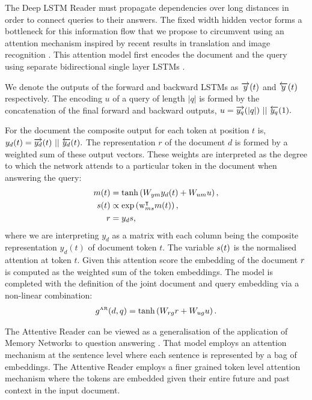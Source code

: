 \documentclass{article}
\newcommand{\wtmat}[2]{W_{#1 #2}}
\begin{document}
The Deep LSTM Reader must propagate dependencies over long distances in order to
connect queries to their answers. The fixed width hidden vector forms a
bottleneck for this information flow that we propose to circumvent using an
attention mechanism inspired by recent results in translation and image
recognition \cite{Bahdanau:2014:NMT,Mnih:2014:RMVA}.
This attention model first encodes the document and the query using separate
bidirectional single layer LSTMs \cite{Graves:2012:SSLRNN}.

We denote the
outputs of the forward and backward LSTMs as $\overrightarrow{y}(t)$ and $\overleftarrow{y}(t)$
respectively.  The encoding $u$ of a query of length $|q|$ is formed by the
concatenation of the final forward and backward outputs,
$u = \overrightarrow{y_q}(|q|)\,\, ||\,\, \overleftarrow{y_q}(1).$

For the document the composite output for each token at position $t$ is,
$y_d(t) = \overrightarrow{y_d}(t)\,\, ||\,\, \overleftarrow{y_d}(t).$
The representation $r$ of the document $d$ is formed by a weighted sum of these
output vectors. These weights are interpreted as the degree to which the network
attends to a particular token in the document when answering the query:
\begin{align*}
  \attnIn(t)    &= \tanh\left(\wtmat{\attnOver}{\attnIn} \attnOver_d(t)
                   + \wtmat{\attnU}{\attnIn} \attnU\right),\\
  \attnScore(t) &\propto \exp \left(\mathrm{w}_{\attnIn\attnScore}^\intercal
                         \attnIn(t) \right),\\
  \attnMix   &= \attnOver_d \attnScore,
\end{align*}
where we are interpreting $y_d$ as a matrix with each column being the composite
representation $y_d(t)$ of document token $t$.
The variable $s(t)$ is the normalised attention at token $t$. Given
this attention score the embedding of the document $r$ is computed as the
weighted sum of the token embeddings.
The model is completed with the definition of the joint document and query
embedding via a non-linear combination:
\begin{align*}
  g^{\text{\tiny AR}}(d,q) = \tanh \left(\wtmat{\attnMix}{g} \attnMix
                             + \wtmat{\attnU}{g} \attnU \right).
\end{align*}

The Attentive Reader can be viewed as a generalisation of the application of
Memory Networks to question answering \cite{Weston:2014:MN}. That model employs
an attention mechanism at the sentence level where each sentence is represented
by a bag of embeddings. The Attentive Reader employs a finer grained token
level attention mechanism where the tokens are embedded given their entire
future and past context in the input document.
\end{document}

